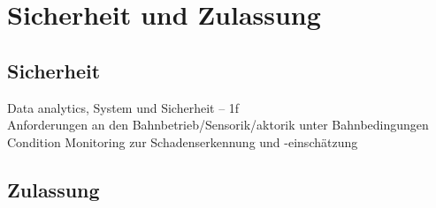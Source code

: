 \section{Sicherheit und Zulassung}

\subsection{Sicherheit}
Data analytics, System und Sicherheit -- 1f\\
Anforderungen an den Bahnbetrieb/Sensorik/aktorik unter Bahnbedingungen\\
Condition Monitoring zur Schadenserkennung und -einschätzung

\subsection{Zulassung}